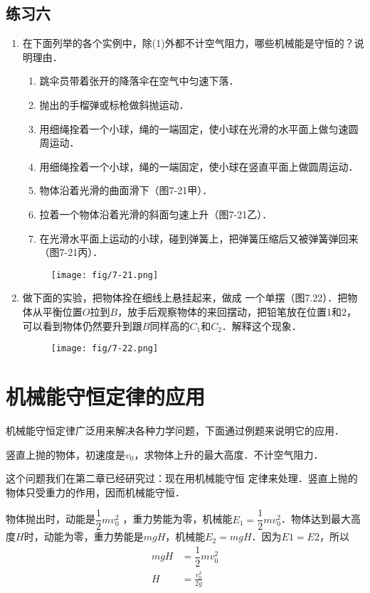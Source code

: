 \subsection*{练习六}
\begin{enumerate}
    \item 在下面列举的各个实例中，除(1)外都不计空气阻力，哪些机械能是守恒的？说明理由．
    \begin{enumerate}[(1)]
        \item 跳伞员带着张开的降落伞在空气中匀速下落．
        \item 抛出的手榴弹或标枪做斜抛运动．
        \item 用细绳拴着一个小球，绳的一端固定，使小球在光滑的水平面上做匀速圆周运动．
        \item 用细绳拴着一个小球，绳的一端固定，使小球在竖直平面上做圆周运动．
        \item 物体沿着光滑的曲面滑下（图7-21甲）．
        \item 拉着一个物体沿着光滑的斜面匀速上升（图7-21乙）．
        \item 在光滑水平面上运动的小球，碰到弹簧上，把弹簧压缩后又被弹簧弹回来（图7-21丙）．
    \end{enumerate}
\begin{figure}[htp]
\centering\texttt{[image: fig/7-21.png]}
\caption{}
\end{figure}

    \item  做下面的实验，把物体拴在细线上悬挂起来，做成
    一个单摆（图7.22）．把物体从平衡位置$O$拉到$B$，放手后观察物体的来回摆动，把铅笔放在位置1和2，可以看到物体仍然要升到跟$B$同样高的$C_1$和$C_2$．解释这个现象．
\begin{figure}[htp]
\centering\texttt{[image: fig/7-22.png]}
\caption{}
\end{figure}
\end{enumerate}

\section{机械能守恒定律的应用}

机械能守恒定律广泛用来解决各种力学问题，下面通过例题来说明它的应用．


\begin{example}
    竖直上抛的物体，初速度是$v_0$，求物体上升的最大高度．不计空气阻力．
\end{example}


\begin{solution}
    这个问题我们在第二章已经研究过：现在用机械能守恒
定律来处理．竖直上抛的物体只受重力的作用，因而机械能守恒．

物体抛出时，动能是$\dfrac{1}{2}mv^2_0$ ，重力势能为零，机械能$E_1=\dfrac{1}{2}mv^2_0$．物体达到最大高度$H$时，动能为零，重力势能是$mgH$，机械能$E_2=mgH$．因为$E1=E2$，所以
\[\begin{split}
    mgH&=\dfrac{1}{2}mv^2_0\\
    H&=\frac{v^2_0}{2g}
\end{split}\]
\end{solution}

